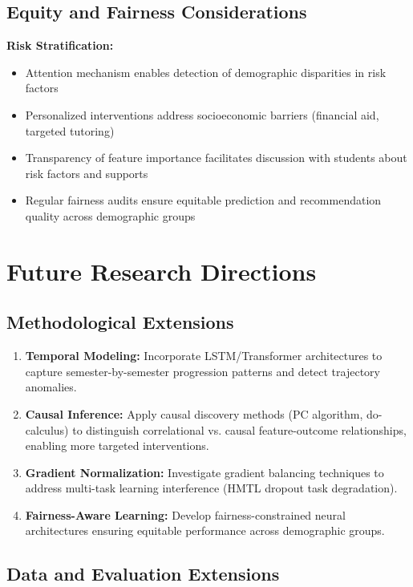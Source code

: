 \subsection{Equity and Fairness Considerations}

\textbf{Risk Stratification:}
\begin{itemize}
\item Attention mechanism enables detection of demographic disparities in risk factors
\item Personalized interventions address socioeconomic barriers (financial aid, targeted tutoring)
\item Transparency of feature importance facilitates discussion with students about risk factors and supports
\item Regular fairness audits ensure equitable prediction and recommendation quality across demographic groups
\end{itemize}

\section{Future Research Directions}

\subsection{Methodological Extensions}

\begin{enumerate}
\item \textbf{Temporal Modeling:} Incorporate LSTM/Transformer architectures to capture semester-by-semester progression patterns and detect trajectory anomalies.

\item \textbf{Causal Inference:} Apply causal discovery methods (PC algorithm, do-calculus) to distinguish correlational vs. causal feature-outcome relationships, enabling more targeted interventions.

\item \textbf{Gradient Normalization:} Investigate gradient balancing techniques to address multi-task learning interference (HMTL dropout task degradation).

\item \textbf{Fairness-Aware Learning:} Develop fairness-constrained neural architectures ensuring equitable performance across demographic groups.
\end{enumerate}

\subsection{Data and Evaluation Extensions}

